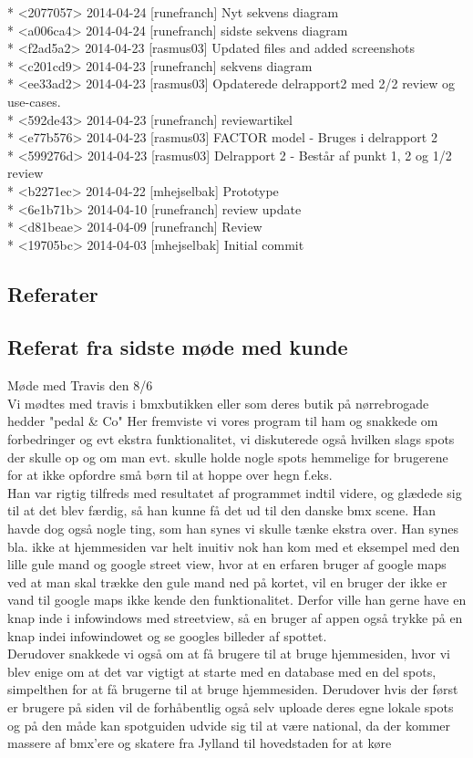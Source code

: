 \documentclass[12pt]{article}
\begin{document}
* <2077057> 2014-04-24 [runefranch]  Nyt sekvens diagram \\
* <a006ca4> 2014-04-24 [runefranch]  sidste sekvens diagram \\ 
* <f2ad5a2> 2014-04-23 [rasmus03]  Updated files and added screenshots \\
* <c201cd9> 2014-04-23 [runefranch]  sekvens diagram \\
* <ee33ad2> 2014-04-23 [rasmus03]  Opdaterede delrapport2 med 2/2 review og use-cases. \\
* <592de43> 2014-04-23 [runefranch]  reviewartikel \\
* <e77b576> 2014-04-23 [rasmus03]  FACTOR model - Bruges i delrapport 2 \\
* <599276d> 2014-04-23 [rasmus03]  Delrapport 2 - Består af punkt 1, 2 og 1/2 review \\
* <b2271ec> 2014-04-22 [mhejselbak]  Prototype \\
* <6e1b71b> 2014-04-10 [runefranch]  review update \\
* <d81beae> 2014-04-09 [runefranch]  Review \\
* <19705bc> 2014-04-03 [mhejselbak]  Initial commit \\
\subsection*{Referater}

\subsection*{Referat fra sidste møde med kunde}
Møde med Travis den 8/6 \\
Vi mødtes med travis i bmxbutikken eller som deres butik på nørrebrogade hedder "pedal \& Co" Her fremviste vi vores program til ham og snakkede om forbedringer og evt ekstra funktionalitet, vi diskuterede også hvilken slags spots der skulle op og om man evt. skulle holde nogle spots hemmelige for brugerene for at ikke opfordre små børn til at hoppe over hegn f.eks.\\
Han var rigtig tilfreds med resultatet af programmet indtil videre, og glædede sig til at det blev færdig, så han kunne få det ud til den danske bmx scene. Han havde dog også nogle ting, som han synes vi skulle tænke ekstra over. Han synes bla. ikke at hjemmesiden var helt inuitiv nok han kom med et eksempel med den lille gule mand og google street view, hvor at en erfaren bruger af google maps ved at man skal trække den gule mand ned på kortet, vil en bruger der ikke er vand til google maps ikke kende den funktionalitet. Derfor ville han gerne have en knap inde i infowindows med streetview, så en bruger af appen også trykke på en knap indei  infowindowet og se googles billeder af spottet.\\
Derudover snakkede vi også om at få brugere til at bruge hjemmesiden, hvor vi blev enige om at det var vigtigt at starte med en database med en del spots, simpelthen for at få brugerne til at bruge hjemmesiden. Derudover hvis der først er brugere på siden vil de forhåbentlig også selv uploade deres egne lokale spots og på den måde kan spotguiden udvide sig til at være national, da der kommer massere af bmx'ere og skatere fra Jylland til hovedstaden for at køre
\end{document}
